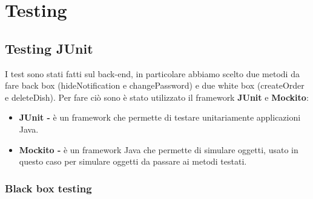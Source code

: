 \section{Testing}
\subsection{Testing JUnit}
I test sono stati fatti sul back-end, in particolare abbiamo scelto due metodi da fare back box (hideNotification e changePassword) e due white box (createOrder e deleteDish).
Per fare ciò sono è stato utilizzato il framework \textbf{JUnit} e \textbf{Mockito}:
\begin{itemize}
  \item \textbf{JUnit -} è un framework che permette di testare unitariamente applicazioni Java.
  \item \textbf{Mockito -} è un framework Java che permette di simulare oggetti, usato in questo caso per simulare oggetti da passare ai metodi testati.
\end{itemize}
\subsubsection{Black box testing}
